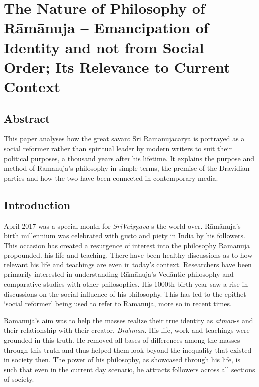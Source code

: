 
\chapter{The Nature of Philosophy of Rāmānuja – Emancipation of Identity and not from Social Order; Its Relevance to Current Context}\label{chapter8}



\section*{Abstract}

\vskip -6pt

This paper analyses how the great savant Sri Ramanujacarya is portrayed as a social reformer rather than spiritual leader by modern writers to suit their political purposes, a thousand years after his lifetime. It explains the purpose and method of Ramanuja's philosophy in simple terms, the premise of the Dravidian parties and how the two have been connected in contemporary media.


\section*{Introduction}

\vskip -6pt

April 2017 was a special month for \textit{SriVaiṣņava}-s the world over. Rāmānuja’s birth millennium was celebrated with gusto and piety in India by his followers. This occasion has created a resurgence of interest into the philosophy Rāmānuja propounded, his life and teaching. There have been healthy discussions as to how relevant his life and teachings are even in today’s context. Researchers have been primarily interested in understanding Rāmānuja’s Vedāntic philosophy and comparative studies with other philosophies. His 1000th birth year saw a rise in discussions on the social influence of his philosophy. This has led to the epithet ‘social reformer’ being used to refer to Rāmānuja, more so in recent times.

Rāmānuja’s aim was to help the masses realize their true identity as \textit{ātman}-s and their relationship with their creator, \textit{Brahman}. His life, work and teachings were grounded in this truth. He removed all bases of differences among the masses through this truth and thus helped them look beyond the inequality that existed in society then. The power of his philosophy, as showcased through his life, is such that even in the current day scenario, he attracts followers across all sections of society.

